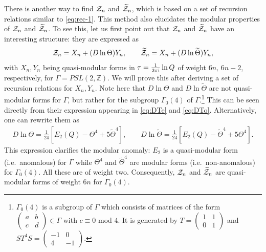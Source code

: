 \documentclass[11pt]{article}
\newcommand{\ri}{{\rm i}}
\renewcommand{\[}{\begin{eqnarray}}
\renewcommand{\]}{\end{eqnarray}}
\newcommand{\bbZ}{{\mathbb Z}}
\newcommand{\Zeven}{{\cal Z}}
\newcommand{\Zodd}{{\widetilde{\cal Z}}}
\newcommand{\Thetaeven}{\Theta}
\newcommand{\Thetaodd}{{\widetilde{\Theta}}}
\begin{document}
There is another way to find $\Zeven_n$ and $\Zodd_n$,
which is based on a set of recursion relations similar to
\eqref{eq:rec-1}.
This method also elucidates the modular properties
of $\Zeven_n$ and $\Zodd_n$.
To see this, let us first point out that
$\Zeven_n$ and $\Zodd_n$ have an interesting structure:
they are expressed as
%
\begin{align}
\label{ZeoinXY}
\Zeven_n=X_n+(D\ln\Thetaeven)Y_n,\qquad
\Zodd_n=X_n+(D\ln\Thetaodd)Y_n,
\end{align}
%
with $X_n,Y_n$ being quasi-modular forms
in $\tau=\frac{1}{2\pi\ri}\ln Q$
of weight $6n,\,6n-2$, respectively,
for $\Gamma=PSL(2,\bbZ)$.
We will prove this after deriving a set of recursion relations
for $X_n, Y_n$.
Note here that $D\ln\Thetaeven$ and $D\ln\Thetaodd$
are not quasi-modular forms for $\Gamma$,
but rather for the subgroup $\Gamma_0(4)$ of $\Gamma$.\footnote{
$\Gamma_0(4)$ is a subgroup of $\Gamma$
which consists of matrices of the form
$
\begin{pmatrix}
 a&b\\c&d
\end{pmatrix}\in\Gamma
$
with $c\equiv 0$ mod $4$.
It is generated by
$T=
\begin{pmatrix}
 1&1\\0&1
\end{pmatrix}
$
and
$ST^4S=
\begin{pmatrix}
 -1&0\\4&-1
\end{pmatrix}
$.}
This can be seen directly from their expression
appearing in \eqref{eq:DTe} and \eqref{eq:DTo}.
Alternatively, one can rewrite them as
%
\begin{align}
D\ln\Thetaeven
 =\frac{1}{24}\left[
 E_2(Q)-\Thetaeven^4+5\Thetaodd^4\right],\qquad
D\ln\Thetaodd
 =\frac{1}{24}\left[
 E_2(Q)-\Thetaodd^4+5\Thetaeven^4\right].
\end{align}
%
This expression clarifies the modular anomaly:
$E_2$ is a quasi-modular form (i.e.~anomalous) for $\Gamma$
while $\Thetaeven^4$ and $\Thetaodd^4$ are
modular forms (i.e.~non-anomalous) for $\Gamma_0(4)$.
All these are of weight two.
Consequently,
$\Zeven_n$ and $\Zodd_n$
are quasi-modular forms of weight $6n$
for $\Gamma_0(4)$.
\end{document}
